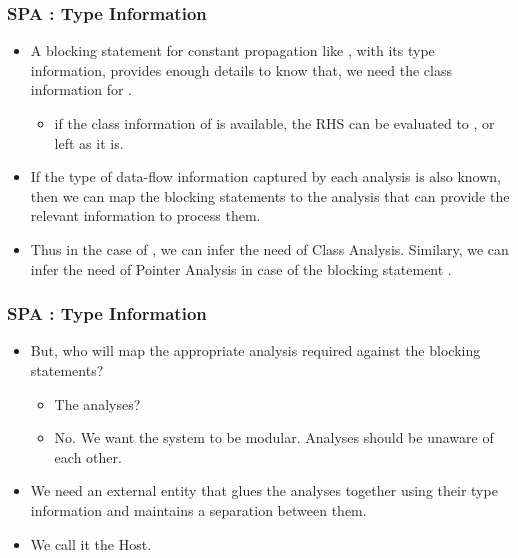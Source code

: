 \begin{frame}
  \frametitle{SPA : Type Information}
    \begin{itemize}
        \item<1-> A blocking statement for constant propagation like , with its type information, provides enough details to know that, we need the class information for .
            \begin{itemize}
                \item<2-> if the class information of  is available, the RHS can be evaluated to ,  or left as it is.
            \end{itemize}

        \item<3-> If the type of data-flow information captured by each analysis is also known, then we can map the blocking statements to the analysis that can provide the relevant information to process them.

        \item<4-> Thus in the case of , we can infer the need of Class Analysis. Similary, we can infer the need of Pointer Analysis in case of the blocking statement .

    \end{itemize}

\end{frame}


\begin{frame}
  \frametitle{SPA : Type Information}
    \begin{itemize}
        \item<1-> But, who will map the appropriate analysis required against the blocking statements?
            \begin{itemize}
                \item<2-> The analyses?
                \item<3-> No. We want the system to be modular. Analyses should be unaware of each other.
            \end{itemize}

        \item<4-> We need an external entity that glues the analyses together using their type information and maintains a separation between them.

        \item<5-> We call it the Host.
    \end{itemize}

\end{frame}


